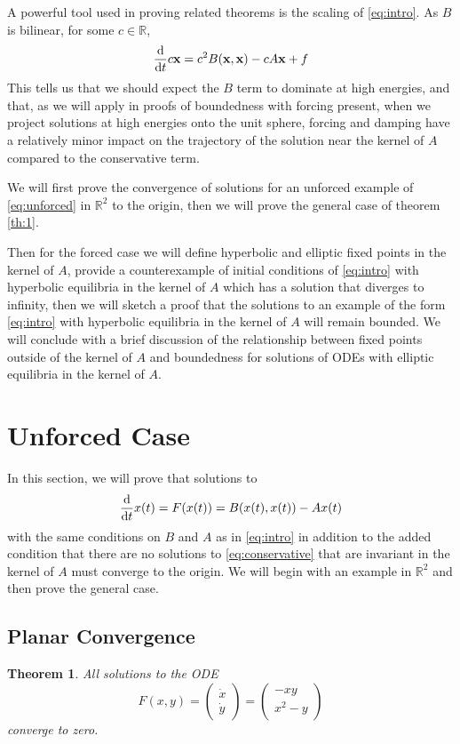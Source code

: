 \documentclass[11pt]{article}
\newtheorem{theorem}{Theorem}
\newcommand{\R}{\mathbb{R}}
\newtheorem{theorem}{Theorem}
\begin{document}
A powerful tool used in proving related theorems is the scaling of \eqref{eq:intro}. As $B$ is bilinear, for some $c\in \R$, $$\dv{}{t}c\mathbf{x}  = c^2B(\mathbf{x}, \mathbf{x}) - cA\mathbf{x} + f$$ This tells us that we should expect the $B$ term to dominate at high energies, and that, as we will apply in proofs of boundedness with forcing present, when we project solutions at high energies onto the unit sphere, forcing and damping have a relatively minor impact on the trajectory of the solution near the kernel of $A$ compared to the conservative term. 

We will first prove the convergence of solutions for an unforced example of \eqref{eq:unforced} in $\R^2$ to the origin, then we will prove the general case of theorem \ref{th:1}. 

Then for the forced case we will define hyperbolic and elliptic fixed points in the kernel of $A$, provide a counterexample of initial conditions of \eqref{eq:intro} with hyperbolic equilibria in the kernel of $A$ which has a solution that diverges to infinity, then we will sketch a proof that the solutions to an example of the form \eqref{eq:intro} with hyperbolic equilibria in the kernel of $A$ will remain bounded. We will conclude with a brief discussion of the relationship between fixed points outside of the kernel of $A$ and boundedness for solutions of ODEs with elliptic equilibria in the kernel of $A$. 




\section{Unforced Case}
In this section, we will prove that solutions to  
\begin{equation*}
    \dv{}{t}x(t) = F(x(t)) = B(x(t), x(t)) - Ax(t) 
\end{equation*}
with the same conditions on $B$ and $A$ as in \eqref{eq:intro} in addition to the added condition that there are no solutions to \eqref{eq:conservative} that are invariant in the kernel of $A$ must converge to the origin. We will begin with an example in $\R^2$ and then prove the general case. 

\subsection{Planar Convergence}

\begin{theorem}
    All solutions to the ODE 
    \begin{equation}\label{eq:planar}
    F(x, y) = \begin{pmatrix}
        \dot{x}\\
        \dot{y}
    \end{pmatrix} = \begin{pmatrix}
        -xy\\
        x^2 - y
    \end{pmatrix}
    \end{equation}
 converge to zero.
\end{theorem}
\end{document}
